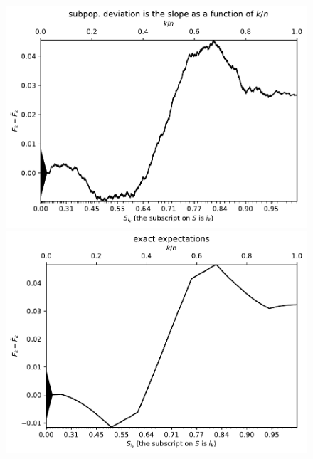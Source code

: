 \documentclass{article}
\begin{document}
\begin{figure}
\begin{centering}

\parbox{\imsize}{\includegraphics[width=\imsize]
                 {./codes/unweighted/50000_2500_10_1/cumulative.pdf}}
\quad\quad
\parbox{\imsize}{\includegraphics[width=\imsize]
                 {./codes/unweighted/50000_2500_10_1/cumulative_exact.pdf}}

\vspace{\vertsep}


\end{centering}
\end{figure}
\end{document}
